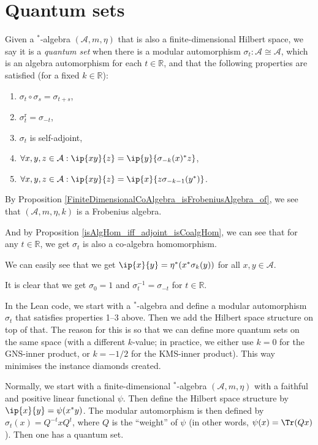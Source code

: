 \chapter{Quantum sets}

 \begin{definition}\label{QuantumSet}
  \leanok
  Given a $^*$-algebra $(\mathcal{A},m,\eta)$ that is also a finite-dimensional Hilbert space,
  we say it is a \textit{quantum set} when there is a modular automorphism $\sigma_t\colon\mathcal{A}\cong\mathcal{A}$, which is an algebra automorphism for each $t\in\mathbb{R}$, and that the following properties are satisfied (for a fixed $k\in\mathbb{R}$):
  \begin{enumerate}
   \item $\sigma_t\circ\sigma_s=\sigma_{t+s}$,
   \item $\sigma_t^{\operatorname{r}}=\sigma_{-t}$,
   \item $\sigma_t$ is self-adjoint,
   \item $\forall{x,y,z}\in\mathcal{A}:\ip{xy}{z}=\ip{y}{\sigma_{-k}(x)^*z}$,
   \item $\forall{x,y,z}\in\mathcal{A}:\ip{xy}{z}=\ip{x}{z\sigma_{-k-1}(y^*)}$.
  \end{enumerate}
  By Proposition \ref{FiniteDimensionalCoAlgebra_isFrobeniusAlgebra_of}, we see that $(\mathcal{A},m,\eta,k)$ is a Frobenius algebra.

  And by Proposition \ref{isAlgHom_iff_adjoint_isCoalgHom}, we can see that for any $t\in\mathbb{R}$, we get $\sigma_t$ is also a co-algebra homomorphism.

  We can easily see that we get $\ip{x}{y}=\eta^*(x^*\sigma_k(y))$ for all $x,y\in\mathcal{A}$.

  It is clear that we get $\sigma_0=1$ and $\sigma_{t}^{-1}=\sigma_{-t}$ for $t\in\mathbb{R}$.
 \end{definition}
 \begin{remark}
  In the Lean code, we start with a $^*$-algebra and define a modular automorphism $\sigma_t$ that satisfies properties 1--3 above.
  Then we add the Hilbert space structure on top of that.
  The reason for this is so that we can define more quantum sets on the same space (with a different $k$-value; in practice, we either use $k=0$ for the GNS-inner product, or $k=-1/2$ for the KMS-inner product).
  This way minimises the instance diamonds created.

  Normally, we start with a finite-dimensional $^*$-algebra $(\mathcal{A},m,\eta)$ with a faithful and positive linear functional $\psi$. Then define the Hilbert space structure by $\ip{x}{y}=\psi(x^*y)$.
  The modular automorphism is then defined by $\sigma_t(x)=Q^{-t}xQ^t$, where $Q$ is the ``weight'' of $\psi$ (in other words, $\psi(x)=\Tr(Q x)$).
  Then one has a quantum set.
 \end{remark}

